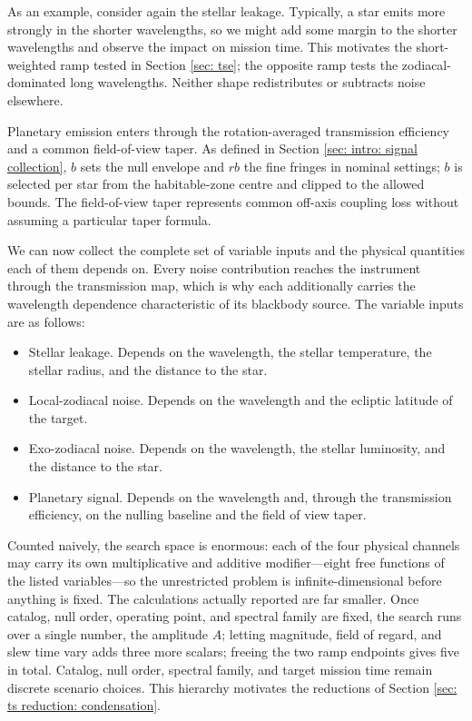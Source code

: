 \documentclass[12pt,a4paper]{article}
\numberwithin{equation}{section}
\numberwithin{figure}{section}
\numberwithin{table}{section}
\begin{document}
As an example, consider again the stellar leakage. Typically, a star emits more strongly in the shorter wavelengths, so we might add some margin to the shorter wavelengths and observe the impact on mission time. This motivates the short-weighted ramp tested in Section \ref{sec: tse}; the opposite ramp tests the zodiacal-dominated long wavelengths. Neither shape redistributes or subtracts noise elsewhere.

Planetary emission enters through the rotation-averaged transmission efficiency and a common field-of-view taper. As defined in Section \ref{sec: intro: signal collection}, $b$ sets the null envelope and $rb$ the fine fringes in nominal settings; $b$ is selected per star from the habitable-zone centre and clipped to the allowed bounds. The field-of-view taper represents common off-axis coupling loss without assuming a particular taper formula.

We can now collect the complete set of variable inputs and the physical quantities each of them depends on. Every noise contribution reaches the instrument through the transmission map, which is why each additionally carries the wavelength dependence characteristic of its blackbody source. The variable inputs are as follows:
\begin{itemize}
    \item Stellar leakage. Depends on the wavelength, the stellar temperature, the stellar radius, and the distance to the star.
    \item Local-zodiacal noise. Depends on the wavelength and the ecliptic latitude of the target.
    \item Exo-zodiacal noise. Depends on the wavelength, the stellar luminosity, and the distance to the star.
    \item Planetary signal. Depends on the wavelength and, through the transmission efficiency, on the nulling baseline and the field of view taper.
\end{itemize}
Counted naively, the search space is enormous: each of the four physical channels may carry its own multiplicative and additive modifier---eight free functions of the listed variables---so the unrestricted problem is infinite-dimensional before anything is fixed. The calculations actually reported are far smaller. Once catalog, null order, operating point, and spectral family are fixed, the search runs over a single number, the amplitude $A$; letting magnitude, field of regard, and slew time vary adds three more scalars; freeing the two ramp endpoints gives five in total. Catalog, null order, spectral family, and target mission time remain discrete scenario choices. This hierarchy motivates the reductions of Section \ref{sec: ts reduction: condensation}.
\end{document}

